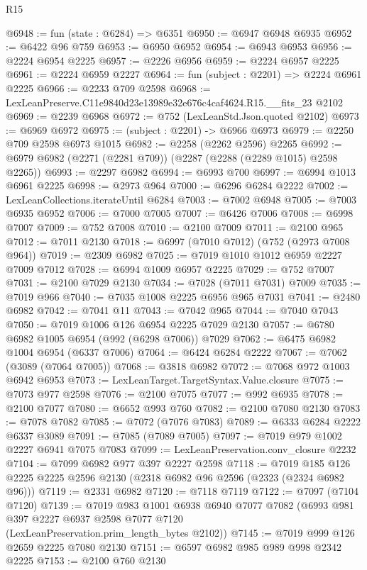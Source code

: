 \begin{lexlean}{R15}
\begin{coremodule}
@6948 := fun (state : @6284) => @6351
@6950 := @6947 @6948 @6935
@6952 := @6422 @96 @759
@6953 := @6950 @6952
@6954 := @6943 @6953
@6956 := @2224 @6954 @2225
@6957 := @2226 @6956
@6959 := @2224 @6957 @2225
@6961 := @2224 @6959 @2227
@6964 := fun (subject : @2201) => @2224 @6961 @2225
@6966 := @2233 @709 @2598
@6968 := LexLeanPreserve.C11e9840d23e13989e32e676c4caf4624.R15.__fits_23 @2102
@6969 := @2239 @6968
@6972 := @752 (LexLeanStd.Json.quoted @2102)
@6973 := @6969 @6972
@6975 := (subject : @2201) -> @6966 @6973
@6979 := @2250 @709 @2598 @6973 @1015
@6982 := @2258 (@2262 @2596) @2265
@6992 := @6979 @6982 (@2271 (@2281 @709)) (@2287 (@2288 (@2289 @1015) @2598 @2265))
@6993 := @2297 @6982
@6994 := @6993 @700
@6997 := @6994 @1013 @6961 @2225
@6998 := @2973 @964
@7000 := @6296 @6284 @2222
@7002 := LexLeanCollections.iterateUntil @6284
@7003 := @7002 @6948
@7005 := @7003 @6935 @6952
@7006 := @7000 @7005
@7007 := @6426 @7006
@7008 := @6998 @7007
@7009 := @752 @7008
@7010 := @2100 @7009
@7011 := @2100 @965
@7012 := @7011 @2130
@7018 := @6997 (@7010 @7012) (@752 (@2973 @7008 @964))
@7019 := @2309 @6982
@7025 := @7019 @1010 @1012 @6959 @2227 @7009 @7012
@7028 := @6994 @1009 @6957 @2225
@7029 := @752 @7007
@7031 := @2100 @7029 @2130
@7034 := @7028 (@7011 @7031) @7009
@7035 := @7019 @966
@7040 := @7035 @1008 @2225 @6956 @965 @7031
@7041 := @2480 @6982
@7042 := @7041 @11
@7043 := @7042 @965
@7044 := @7040 @7043
@7050 := @7019 @1006 @126 @6954 @2225 @7029 @2130
@7057 := @6780 @6982 @1005 @6954 (@992 (@6298 @7006)) @7029
@7062 := @6475 @6982 @1004 @6954 (@6337 @7006)
@7064 := @6424 @6284 @2222
@7067 := @7062 (@3089 (@7064 @7005))
@7068 := @3818 @6982
@7072 := @7068 @972 @1003 @6942 @6953
@7073 := LexLeanTarget.TargetSyntax.Value.closure
@7075 := @7073 @977 @2598
@7076 := @2100 @7075
@7077 := @992 @6935
@7078 := @2100 @7077
@7080 := @6652 @993 @760
@7082 := @2100 @7080 @2130
@7083 := @7078 @7082
@7085 := @7072 (@7076 @7083)
@7089 := @6333 @6284 @2222 @6337 @3089
@7091 := @7085 (@7089 @7005)
@7097 := @7019 @979 @1002 @2227 @6941 @7075 @7083
@7099 := LexLeanPreservation.conv_closure @2232
@7104 := @7099 @6982 @977 @397 @2227 @2598
@7118 := @7019 @185 @126 @2225 @2225 @2596 @2130 (@2318 @6982 @96 @2596 (@2323 (@2324 @6982 @96)))
@7119 := @2331 @6982
@7120 := @7118 @7119
@7122 := @7097 (@7104 @7120)
@7139 := @7019
    @983
    @1001
    @6938
    @6940
    @7077
    @7082
    (@6993 @981 @397 @2227 @6937 @2598 @7077 @7120 (LexLeanPreservation.prim_length_bytes @2102))
@7145 := @7019 @999 @126 @2659 @2225 @7080 @2130
@7151 := @6597 @6982 @985 @989 @998 @2342 @2225
@7153 := @2100 @760 @2130

\end{coremodule}
\end{lexlean}

